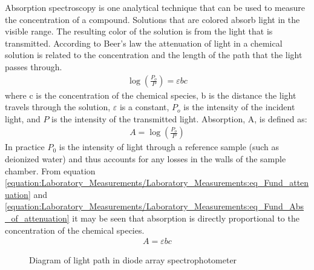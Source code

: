 \documentclass[letterpaper,10pt,english]{sphinxmanual}
\let\sphinxpxdimen\pdfpxdimen\else\newdimen\sphinxpxdimen
\begin{document}
Absorption spectroscopy is one analytical technique that can be used to measure the concentration of a compound. Solutions that are colored absorb light in the visible range. The resulting color of the solution is from the light that is transmitted. According to Beer’s law the attenuation of light in a chemical solution is related to the concentration and the length of the path that the light passes through.
\begin{equation}\label{equation:Laboratory_Measurements/Laboratory_Measurements:eq_Fund_attenuation}
\begin{split}\log \left(\frac{P_o }{P} \right)=\varepsilon bc\end{split}
\end{equation}
where c is the concentration of the chemical species, b is the distance the light travels through the solution, \(\varepsilon\) is a constant, \(P_o\) is the intensity of the incident light, and \(P\) is the intensity of the transmitted light. Absorption, A, is defined as:
\begin{equation}\label{equation:Laboratory_Measurements/Laboratory_Measurements:eq_Fund_Abs_of_attenuation}
\begin{split}A=\log \left(\frac{P_{o} }{P} \right)\end{split}
\end{equation}
In practice \(P_0\) is the intensity of light through a reference sample (such as deionized water) and thus accounts for any losses in the walls of the sample chamber. From equation \eqref{equation:Laboratory_Measurements/Laboratory_Measurements:eq_Fund_attenuation} and \eqref{equation:Laboratory_Measurements/Laboratory_Measurements:eq_Fund_Abs_of_attenuation} it may be seen that absorption is directly proportional to the concentration of the chemical species.
\begin{equation}\label{equation:Laboratory_Measurements/Laboratory_Measurements:eq_Fund_Beer}
\begin{split}A=\varepsilon bc\end{split}
\end{equation}
\begin{figure}[htbp]
\centering
\capstart

\noindent\sphinxincludegraphics[width=300\sphinxpxdimen]{{Spectrophotometer}.png}
\caption{Diagram of light path in diode array spectrophotometer}\label{\detokenize{Laboratory_Measurements/Laboratory_Measurements:id1}}\label{\detokenize{Laboratory_Measurements/Laboratory_Measurements:figure-spectrophotometer}}\end{figure}
\end{document}
